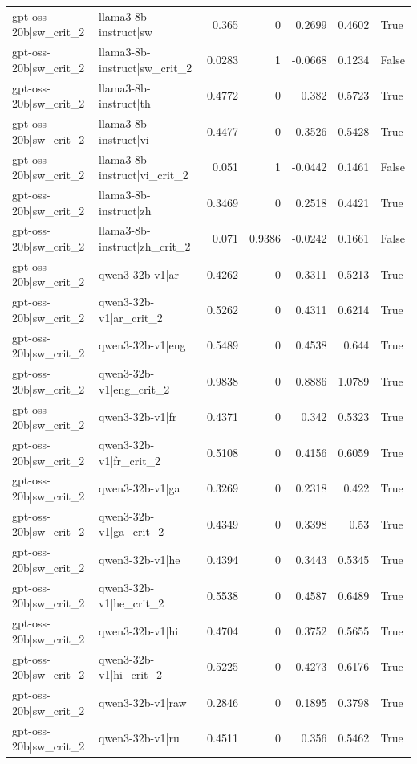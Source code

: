 \begin{table}
\begin{tabular}{l l r r r r l}
gpt-oss-20b|sw_crit_2 & llama3-8b-instruct|sw & 0.365 & 0 & 0.2699 & 0.4602 & True \\
gpt-oss-20b|sw_crit_2 & llama3-8b-instruct|sw_crit_2 & 0.0283 & 1 & -0.0668 & 0.1234 & False \\
gpt-oss-20b|sw_crit_2 & llama3-8b-instruct|th & 0.4772 & 0 & 0.382 & 0.5723 & True \\
gpt-oss-20b|sw_crit_2 & llama3-8b-instruct|vi & 0.4477 & 0 & 0.3526 & 0.5428 & True \\
gpt-oss-20b|sw_crit_2 & llama3-8b-instruct|vi_crit_2 & 0.051 & 1 & -0.0442 & 0.1461 & False \\
gpt-oss-20b|sw_crit_2 & llama3-8b-instruct|zh & 0.3469 & 0 & 0.2518 & 0.4421 & True \\
gpt-oss-20b|sw_crit_2 & llama3-8b-instruct|zh_crit_2 & 0.071 & 0.9386 & -0.0242 & 0.1661 & False \\
gpt-oss-20b|sw_crit_2 & qwen3-32b-v1|ar & 0.4262 & 0 & 0.3311 & 0.5213 & True \\
gpt-oss-20b|sw_crit_2 & qwen3-32b-v1|ar_crit_2 & 0.5262 & 0 & 0.4311 & 0.6214 & True \\
gpt-oss-20b|sw_crit_2 & qwen3-32b-v1|eng & 0.5489 & 0 & 0.4538 & 0.644 & True \\
gpt-oss-20b|sw_crit_2 & qwen3-32b-v1|eng_crit_2 & 0.9838 & 0 & 0.8886 & 1.0789 & True \\
gpt-oss-20b|sw_crit_2 & qwen3-32b-v1|fr & 0.4371 & 0 & 0.342 & 0.5323 & True \\
gpt-oss-20b|sw_crit_2 & qwen3-32b-v1|fr_crit_2 & 0.5108 & 0 & 0.4156 & 0.6059 & True \\
gpt-oss-20b|sw_crit_2 & qwen3-32b-v1|ga & 0.3269 & 0 & 0.2318 & 0.422 & True \\
gpt-oss-20b|sw_crit_2 & qwen3-32b-v1|ga_crit_2 & 0.4349 & 0 & 0.3398 & 0.53 & True \\
gpt-oss-20b|sw_crit_2 & qwen3-32b-v1|he & 0.4394 & 0 & 0.3443 & 0.5345 & True \\
gpt-oss-20b|sw_crit_2 & qwen3-32b-v1|he_crit_2 & 0.5538 & 0 & 0.4587 & 0.6489 & True \\
gpt-oss-20b|sw_crit_2 & qwen3-32b-v1|hi & 0.4704 & 0 & 0.3752 & 0.5655 & True \\
gpt-oss-20b|sw_crit_2 & qwen3-32b-v1|hi_crit_2 & 0.5225 & 0 & 0.4273 & 0.6176 & True \\
gpt-oss-20b|sw_crit_2 & qwen3-32b-v1|raw & 0.2846 & 0 & 0.1895 & 0.3798 & True \\
gpt-oss-20b|sw_crit_2 & qwen3-32b-v1|ru & 0.4511 & 0 & 0.356 & 0.5462 & True \\

\end{tabular}
\end{table}
